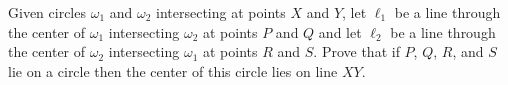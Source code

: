 Given circles $\omega_1$ and $\omega_2$ intersecting at points $X$ and $Y$, let $\ell_1$ be a line through the center of $\omega_1$ intersecting $\omega_2$ at points $P$ and $Q$ and let $\ell_2$ be a line through the center of $\omega_2$ intersecting $\omega_1$ at points $R$ and $S$. Prove that if $P$, $Q$, $R$, and $S$ lie on a circle then the center of this circle lies on line $XY$.
